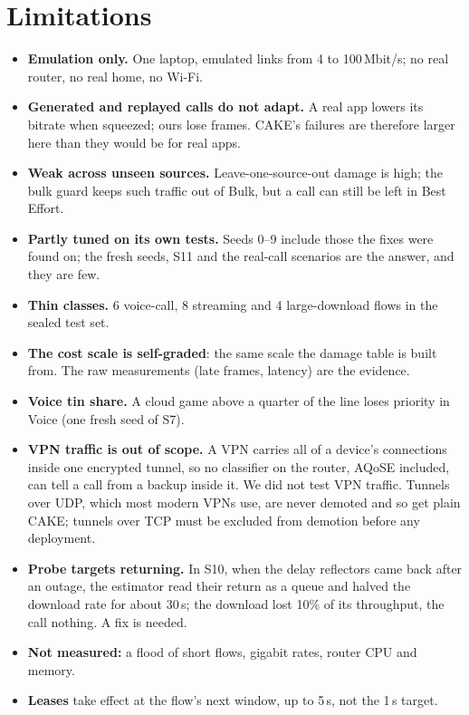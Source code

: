 \documentclass[11pt,a4paper]{article}
\newif\ifnewpage\newpagetrue
\newcommand{\newpagenext}{\global\newpagetrue}
\begin{document}
\section{Limitations}\label{sec:limits}
\newpagenext
\begin{itemize}
\item \textbf{Emulation only.} One laptop, emulated links from 4 to 100\,Mbit/s; no real router, no real home, no Wi-Fi.
\item \textbf{Generated and replayed calls do not adapt.} A real app lowers its bitrate when squeezed; ours lose frames. CAKE's failures are therefore larger here than they would be for real apps.
\item \textbf{Weak across unseen sources.} Leave-one-source-out damage is high; the bulk guard keeps such traffic out of Bulk, but a call can still be left in Best Effort.
\item \textbf{Partly tuned on its own tests.} Seeds 0--9 include those the fixes were found on; the fresh seeds, S11 and the real-call scenarios are the answer, and they are few.
\item \textbf{Thin classes.} 6 voice-call, 8 streaming and 4 large-download flows in the sealed test set.
\item \textbf{The cost scale is self-graded}: the same scale the damage table is built from. The raw measurements (late frames, latency) are the evidence.
\item \textbf{Voice tin share.} A cloud game above a quarter of the line loses priority in Voice (one fresh seed of S7).
\item \textbf{VPN traffic is out of scope.} A VPN carries all of a device's connections inside one encrypted tunnel, so no classifier on the router, AQoSE included, can tell a call from a backup inside it. We did not test VPN traffic. Tunnels over UDP, which most modern VPNs use, are never demoted and so get plain CAKE; tunnels over TCP must be excluded from demotion before any deployment.
\item \textbf{Probe targets returning.} In S10, when the delay reflectors came back after an outage, the estimator read their return as a queue and halved the download rate for about 30\,s; the download lost 10\% of its throughput, the call nothing. A fix is needed.
\item \textbf{Not measured:} a flood of short flows, gigabit rates, router CPU and memory.
\item \textbf{Leases} take effect at the flow's next window, up to 5\,s, not the 1\,s target.
\end{itemize}
\end{document}
